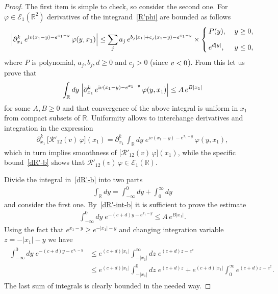 \documentclass[11pt]{article}
\numberwithin{equation}{section}
\theoremstyle{plain}
\theoremstyle{definition}
\let\Im\relax
\DeclareMathOperator{\Im}{Im}
\renewcommand{\phi}{\varphi}
\renewcommand{\imath}{\mathrm{i}}
\begin{document}
\begin{proof}
	The first item is simple to check, so consider the second one. For $\phi \in \mathcal{E}_1(\mathbb{R}^2)$ derivatives of the integrand~\eqref{R'phi} are bounded as follows
	\begin{align}\label{dR'-int-b}
		\Bigl| \partial_{x_1}^k \, e^{  \imath v(x_1 - y) - e^{x_1 - y} } \, \phi(y, x_1) \Bigr| 
		\leq \sum_j a_j \, e^{ b_j |x_1| + c_j (x_1 - y) - e^{x_1 - y} } \times
		\left\{ 
		\begin{aligned}
			& \, P(y), && \; y \geq 0, \\[6pt]
			& \, e^{d | y|}, && \; y \leq 0,
		\end{aligned}
		\right.
	\end{align}
	where $P$ is polynomial, $a_j, b_j, d \geq 0$ and $c_j > 0$ (since $\Im v < 0$). From this let us prove that
	\begin{align} \label{dR'-b}
		\int_{\mathbb{R}} dy \; \Bigl| \partial_{x_1}^k \, e^{  \imath v(x_1 - y) - e^{x_1 - y} } \, \phi(y, x_1) \Bigr| \leq A \, e^{B |x_1| }
	\end{align}
	for some $A, B \geq 0$ and that convergence of the above integral is uniform in $x_1$ from compact subsets of $\mathbb{R}$. Uniformity allows to interchange derivatives and integration in the expression
	\begin{align}
		\partial_{x_1}^k \, \bigl[ \mathcal{R}'_{12}(v) \, \phi \bigr] (x_1) = \partial_{x_1}^k \, \int_{\mathbb{R}} dy \; e^{  \imath v(x_1 - y) - e^{x_1 - y} } \, \phi(y, x_1) ,
	\end{align}
	which in turn implies smoothness of $\bigl[ \mathcal{R}'_{12}(v) \, \phi \bigr] (x_1) $, while the specific bound~\eqref{dR'-b} shows that $ \mathcal{R}'_{12}(v) \, \phi \in \mathcal{E}_1(\mathbb{R})$.
	
	Divide the integral in~\eqref{dR'-b} into two parts
	\begin{align} \label{int-div}
		\int_{\mathbb{R}} dy = \int_{-\infty}^0 dy + \int_0^\infty dy
	\end{align} 
	and consider the first one. By~\eqref{dR'-int-b} it is sufficient to prove the estimate
	\begin{align}
		\int_{-\infty}^0 dy \; e^{- (c + d) y - e^{x_1 - y}} \leq A \, e^{B |x_1|}.
	\end{align}
	Using the fact that $e^{x_1 - y} \geq e^{-|x_1| - y}$ and changing integration variable $z = - |x_1| - y$ we have
	\begin{align}
		\begin{aligned}
			\int_{-\infty}^0 dy \; e^{- (c + d) y - e^{x_1 - y}} & \leq e^{(c + d) |x_1|} \int_{-|x_1|}^\infty dz \; e^{(c + d) z - e^{z}} \\[6pt]
			& \leq e^{(c + d)|x_1|} \int_{-|x_1|}^0 dz \; e^{(c + d) z} + e^{(c+ d)|x_1|} \int_0^\infty e^{(c+d)z - e^z}.
		\end{aligned}
	\end{align}
	The last sum of integrals is clearly bounded in the needed way.
	

\end{proof}
\end{document}
